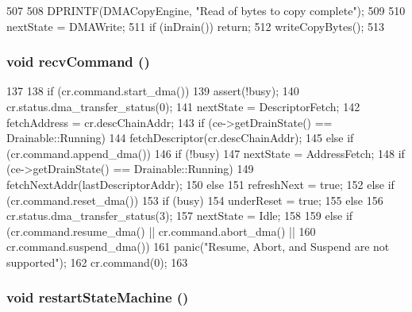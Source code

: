 \begin{DoxyCode}
507 {
508     DPRINTF(DMACopyEngine, "Read of bytes to copy complete\n");
509 
510     nextState = DMAWrite;
511     if (inDrain()) return;
512     writeCopyBytes();
513 }
\end{DoxyCode}
\hypertarget{classCopyEngine_1_1CopyEngineChannel_a29f4846167c0833db565e7848de4c3a2}{
\subsubsection[{recvCommand}]{\setlength{\rightskip}{0pt plus 5cm}void recvCommand ()}}
\label{classCopyEngine_1_1CopyEngineChannel_a29f4846167c0833db565e7848de4c3a2}



\begin{DoxyCode}
137 {
138     if (cr.command.start_dma()) {
139         assert(!busy);
140         cr.status.dma_transfer_status(0);
141         nextState = DescriptorFetch;
142         fetchAddress = cr.descChainAddr;
143         if (ce->getDrainState() == Drainable::Running)
144             fetchDescriptor(cr.descChainAddr);
145     } else if (cr.command.append_dma()) {
146         if (!busy) {
147             nextState = AddressFetch;
148             if (ce->getDrainState() == Drainable::Running)
149                 fetchNextAddr(lastDescriptorAddr);
150         } else
151             refreshNext = true;
152     } else if (cr.command.reset_dma()) {
153         if (busy)
154             underReset = true;
155         else {
156             cr.status.dma_transfer_status(3);
157             nextState = Idle;
158         }
159     } else if (cr.command.resume_dma() || cr.command.abort_dma() ||
160             cr.command.suspend_dma())
161         panic("Resume, Abort, and Suspend are not supported\n");
162     cr.command(0);
163 }
\end{DoxyCode}
\hypertarget{classCopyEngine_1_1CopyEngineChannel_a9504930bccd8ae4e8593d3aefaba7548}{
\subsubsection[{restartStateMachine}]{\setlength{\rightskip}{0pt plus 5cm}void restartStateMachine ()}}
\label{classCopyEngine_1_1CopyEngineChannel_a9504930bccd8ae4e8593d3aefaba7548}



